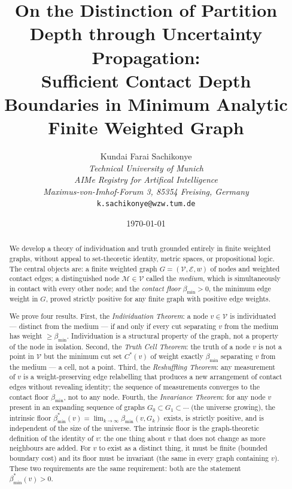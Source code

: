 \documentclass[11pt,twocolumn,a4paper]{article}
\title{\textbf{On the Distinction of Partition Depth through Uncertainty Propagation:\\ Sufficient Contact Depth Boundaries in  Minimum Analytic Finite Weighted Graph}}
\author{Kundai Farai Sachikonye\\
\textit{Technical University of Munich}\\
\textit{AIMe Registry for Artifical Intelligence}\\
\textit{Maximus-von-Imhof-Forum 3, 85354 Freising, Germany}\\
\texttt{k.sachikonye@wzw.tum.de}}
\date{\today}
\theoremstyle{plain}
\theoremstyle{definition}
\theoremstyle{remark}
\newcommand{\med}{\mathcal{M}}
\newcommand{\Ecal}{\mathcal{E}}
\newcommand{\Vcal}{\mathcal{V}}
\newcommand{\bmin}{\beta_{\min}}
\begin{document}
\maketitle

\begin{abstract}

We develop a theory of individuation and truth grounded entirely in finite
weighted graphs, without appeal to set-theoretic identity, metric spaces, or
propositional logic. The central objects are: a finite weighted graph
$G = (\Vcal, \Ecal, w)$ of nodes and weighted contact edges; a distinguished
node $\med \in \Vcal$ called the \emph{medium}, which is simultaneously in
contact with every other node; and the \emph{contact floor}
$\bmin > 0$, the minimum edge weight in $G$, proved strictly positive for
any finite graph with positive edge weights.

We prove four results. First, the \emph{Individuation Theorem}: a node $v
\in \Vcal$ is individuated --- distinct from the medium --- if and only if
every cut separating $v$ from the medium has weight $\geq \bmin$.
Individuation is a structural property of the graph, not a property of the
node in isolation. Second, the \emph{Truth Cell Theorem}: the truth of a
node $v$ is not a point in $\Vcal$ but the minimum cut set $C^*(v)$ of
weight exactly $\bmin$ separating $v$ from the medium --- a cell, not a
point. Third, the \emph{Reshuffling Theorem}: any measurement of $v$ is a
weight-preserving edge relabelling that produces a new arrangement of contact
edges without revealing identity; the sequence of measurements converges to
the contact floor $\bmin$, not to any node. Fourth, the
\emph{Invariance Theorem}: for any node $v$ present in an expanding sequence
of graphs $G_0 \subset G_1 \subset \cdots$ (the universe growing), the
intrinsic floor $\bmin^*(v) = \lim_{k\to\infty} \bmin(v, G_k)$ exists,
is strictly positive, and is independent of the size of the universe.
The intrinsic floor is the graph-theoretic definition of the identity of
$v$: the one thing about $v$ that does not change as more neighbours are
added. For $v$ to exist as a distinct thing, it must be finite (bounded
boundary cost) and its floor must be invariant (the same in every graph
containing $v$). These two requirements are the same requirement: both are
the statement $\bmin^*(v) > 0$.


\end{abstract}
\end{document}
